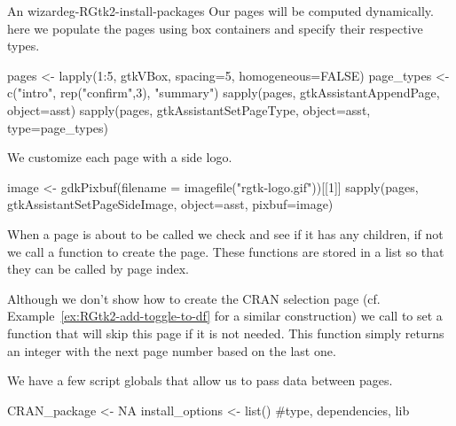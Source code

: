 \begin{example}{An  wizard}{eg-RGtk2-install-packages}
Our pages will be computed dynamically. here we populate the pages
using box containers and specify their respective types. 
\begin{Schunk}
\begin{Sinput}
 pages <- lapply(1:5, gtkVBox, spacing=5, homogeneous=FALSE)
 page_types <- c("intro", rep("confirm",3), "summary")
 sapply(pages, gtkAssistantAppendPage, object=asst)
 sapply(pages, gtkAssistantSetPageType, object=asst, 
        type=page_types)
\end{Sinput}
\end{Schunk}
%
We customize each page with a side logo.
\begin{Schunk}
\begin{Sinput}
 image <- gdkPixbuf(filename = imagefile("rgtk-logo.gif"))[[1]]
 sapply(pages, gtkAssistantSetPageSideImage, object=asst, 
        pixbuf=image)
\end{Sinput}
\end{Schunk}

When a page is about to be called we check and see if it has any
children, if not we call a function to create the page. These
functions are stored in a list so that they can be called by page index.
\begin{Schunk}
\end{Schunk}

Although we don't show how to create the CRAN selection page
(cf. Example~\ref{ex:RGtk2-add-toggle-to-df} for a similar
construction) we call  to set
a function that will skip this page if it is not needed. This function
simply returns an integer with the next page number based on the last one.
\begin{Schunk}
\end{Schunk}

We have a few script globals that allow us to pass data between pages.
\begin{Schunk}
\begin{Sinput}
 CRAN_package <- NA
 install_options <- list() #type, dependencies, lib
\end{Sinput}
\end{Schunk}







\end{example}
